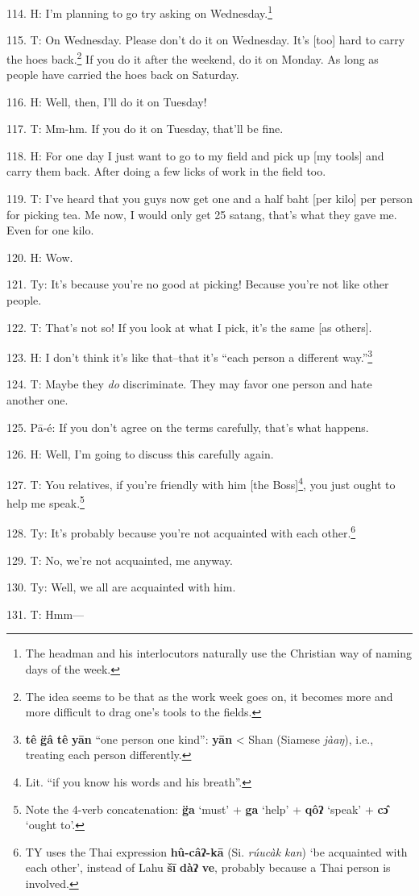 114. H: I'm planning to go try asking on Wednesday.\footnote{The headman and his interlocutors naturally use the Christian way of naming days of the week.}

115. T: On Wednesday. Please don't do it on Wednesday. It's [too] hard to carry
the hoes back.\footnote{The idea seems to be that as the work week goes on, it becomes more and more difficult to drag one's tools to the fields.} If you do it after the weekend, do it on Monday. As long as
people have carried the hoes back on Saturday.

116. H: Well, then, I'll do it on Tuesday!

117. T: Mm-hm. If you do it on Tuesday, that'll be fine.

118. H: For one day I just want to go to my field and pick up [my tools]
and carry them back. After doing a few licks of work in the field too.

119. T: I've heard that you guys now get one and a half baht [per kilo] per person
for picking tea. Me now, I would only get 25 satang, that's what they gave me.
Even for one kilo.

120. H: Wow.

121. Ty: It's because you're no good at picking! Because you're not like other
people.

122. T: That's not so! If you look at what I pick, it's the same [as others].

123. H: I don't think it's like that--that it's ``each person a different
way.''\footnote{\textbf{tê} \textbf{g̈â} \textbf{tê} \textbf{yān} ``one person one kind'': \textbf{yān} < Shan (Siamese\textit{ jàaŋ}), i.e., treating each person differently.}

124. T: Maybe they \textit{do} discriminate. They may favor one person and hate
another one.

125. Pā-é: If you don't agree on the terms carefully, that's what happens.

126. H: Well, I'm going to discuss this carefully again.

127. T: You relatives, if you're friendly with him [the Boss]\footnote{Lit. ``if you know his words and his breath''.}, you just ought
to help me speak.\footnote{Note the 4-verb concatenation: \textbf{g̈a} `must' + \textbf{ga} `help' + \textbf{qôʔ} `speak' + \textbf{cɔ̂} `ought to'.}

128. Ty: It's probably because you're not acquainted with each other.\footnote{TY uses the Thai expression \textbf{hû-câʔ-kā} (Si.\textit{ rúucàk kan}) `be acquainted with each other', instead of Lahu \textbf{šī} \textbf{dàʔ} \textbf{ve}, probably because a Thai person is involved.}

129. T: No, we're not acquainted, me anyway.

130. Ty: Well, we all are acquainted with him.

131. T: Hmm---

